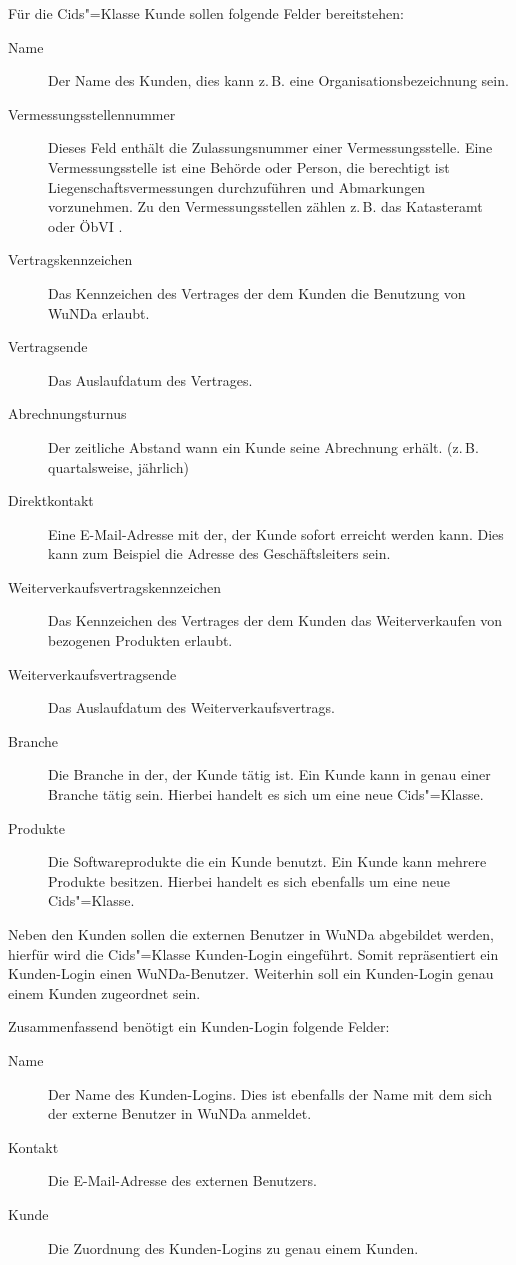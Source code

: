 Für die Cids"=Klasse Kunde sollen folgende Felder bereitstehen:
\begin{description}
\item[Name] Der Name des Kunden, dies kann z.\,B. eine Organisationsbezeichnung sein.
\item[Vermessungsstellennummer] Dieses Feld enthält die Zulassungsnummer einer Vermessungsstelle. Eine Vermessungsstelle ist eine Behörde oder Person, die berechtigt ist Liegenschaftsvermessungen durchzuführen und Abmarkungen vorzunehmen. Zu den Vermessungsstellen zählen z.\,B. das Katasteramt oder ÖbVI \autocite[vgl.][]{recklinghausen-vermessungsstelle}.
\item[Vertragskennzeichen] Das Kennzeichen des Vertrages der dem Kunden die Benutzung von \ac{WuNDa} erlaubt.
\item[Vertragsende] Das Auslaufdatum des Vertrages.
\item[Abrechnungsturnus] Der zeitliche Abstand wann ein Kunde seine Abrechnung erhält. (z.\,B. quartalsweise, jährlich)
\item[Direktkontakt] Eine E-Mail-Adresse mit der, der Kunde sofort erreicht werden kann. Dies kann zum Beispiel die Adresse des Geschäftsleiters sein.
\item[Weiterverkaufsvertragskennzeichen] Das Kennzeichen des Vertrages der dem Kunden das Weiterverkaufen von bezogenen Produkten erlaubt.
\item[Weiterverkaufsvertragsende] Das Auslaufdatum des Weiterverkaufsvertrags.
\item[Branche] Die Branche in der, der Kunde tätig ist. Ein Kunde kann in genau einer Branche tätig sein. Hierbei handelt es sich um eine neue Cids"=Klasse.
\item[Produkte] Die Softwareprodukte die ein Kunde benutzt. Ein Kunde kann mehrere Produkte besitzen. Hierbei handelt es sich ebenfalls um eine neue Cids"=Klasse.
\end{description}

Neben den Kunden sollen die externen Benutzer in \ac{WuNDa} abgebildet werden, hierfür wird die Cids"=Klasse Kunden-Login eingeführt.
Somit repräsentiert ein Kunden-Login einen \ac{WuNDa}-Benutzer.
Weiterhin soll ein Kunden-Login genau einem Kunden zugeordnet sein. 

Zusammenfassend benötigt ein Kunden-Login folgende Felder:
\begin{description}
\item[Name] Der Name des Kunden-Logins. Dies ist ebenfalls der Name mit dem sich der externe Benutzer in \ac{WuNDa} anmeldet.
\item[Kontakt] Die E-Mail-Adresse des externen Benutzers.
\item[Kunde] Die Zuordnung des Kunden-Logins zu genau einem Kunden.
\end{description}

